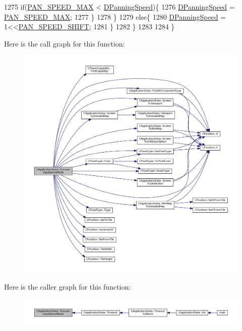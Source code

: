 \begin{DoxyCode}
1275             \textcolor{keywordflow}{if}(\hyperlink{main_8cpp_a33d410346afabd12760fec78db0663fe}{PAN\_SPEED\_MAX} < \hyperlink{classCApplicationData_a9e07e8374b20abfbb57f656e92be8404}{DPanningSpeed})\{
1276                 \hyperlink{classCApplicationData_a9e07e8374b20abfbb57f656e92be8404}{DPanningSpeed} = \hyperlink{main_8cpp_a33d410346afabd12760fec78db0663fe}{PAN\_SPEED\_MAX};
1277             \}
1278         \}
1279         \textcolor{keywordflow}{else}\{
1280             \hyperlink{classCApplicationData_a9e07e8374b20abfbb57f656e92be8404}{DPanningSpeed} = 1<<\hyperlink{main_8cpp_aaf387df20f2ed20a4ec142f9ded9e886}{PAN\_SPEED\_SHIFT};
1281         \}
1282     \}
1283     
1284 \}
\end{DoxyCode}
Here is the call graph for this function\+:\nopagebreak
\begin{figure}[H]
\begin{center}
\leavevmode
\includegraphics[width=350pt]{classCApplicationData_a018490e670662ed9a9266449516a2ac7_cgraph}
\end{center}
\end{figure}
Here is the caller graph for this function\+:\nopagebreak
\begin{figure}[H]
\begin{center}
\leavevmode
\includegraphics[width=350pt]{classCApplicationData_a018490e670662ed9a9266449516a2ac7_icgraph}
\end{center}
\end{figure}
\hypertarget{classCApplicationData_a4fb3ad6900161476b5dace2d7cf9908c}{}\label{classCApplicationData_a4fb3ad6900161476b5dace2d7cf9908c} 
